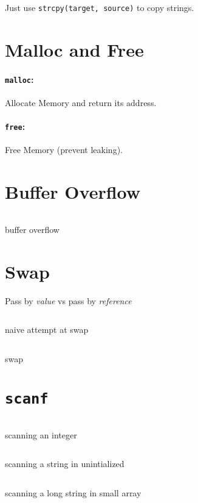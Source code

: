 Just use \texttt{strcpy(target, source)} to copy strings.

\section{Malloc and Free}
\paragraph{\texttt{malloc}:} Allocate Memory and return its address.
\paragraph{\texttt{free}:} Free Memory (prevent leaking).

\section{Buffer Overflow}
\begin{code}
	\inputminted[linenos, breaklines, breakanywhere]{c}{codes/src4/memory.c}
	\caption{buffer overflow}
\end{code}

\section{Swap}
Pass by \emph{value} vs pass by \emph{reference}
\begin{code}
	\inputminted[linenos, breaklines]{c}{codes/src4/noswap.c}
	\caption{naive attempt at swap}
\end{code}
\clearpage
\begin{code}
	\inputminted[linenos, breaklines]{c}{codes/src4/swap.c}
	\caption{swap}
\end{code}

\clearpage
\section{\texorpdfstring{\texttt{scanf}}{}}
\begin{code}
	\inputminted[linenos, breaklines]{c}{codes/src4/scanf0.c}
	\caption{scanning an integer}
\end{code}
\begin{code}
	\inputminted[linenos, breaklines]{c}{codes/src4/scanf1.c}
	\caption{scanning a string in unintialized}
\end{code}
\clearpage
\begin{code}
	\inputminted[linenos, breaklines]{c}{codes/src4/scanf2.c}
	\caption{scanning a long string in small array}
\end{code}

